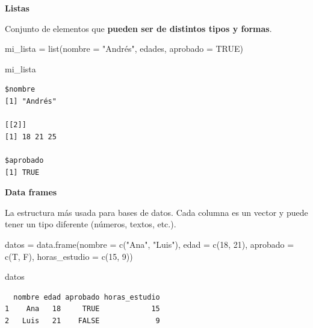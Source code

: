 \documentclass[
  letterpaper,
  DIV=11,
  numbers=noendperiod,
  twoside]{scrreprt}
\newenvironment{Shaded}{\begin{snugshade}}{\end{snugshade}}
\newcommand{\AttributeTok}[1]{\textcolor[rgb]{0.40,0.45,0.13}{#1}}
\newcommand{\ConstantTok}[1]{\textcolor[rgb]{0.56,0.35,0.01}{#1}}
\newcommand{\DecValTok}[1]{\textcolor[rgb]{0.68,0.00,0.00}{#1}}
\newcommand{\FunctionTok}[1]{\textcolor[rgb]{0.28,0.35,0.67}{#1}}
\newcommand{\NormalTok}[1]{\textcolor[rgb]{0.00,0.23,0.31}{#1}}
\newcommand{\OtherTok}[1]{\textcolor[rgb]{0.00,0.23,0.31}{#1}}
\newcommand{\StringTok}[1]{\textcolor[rgb]{0.13,0.47,0.30}{#1}}
\begin{document}
\textbf{Listas}

Conjunto de elementos que \textbf{pueden ser de distintos tipos y
formas}.

\begin{Shaded}
\begin{Highlighting}[]
\NormalTok{mi\_lista }\OtherTok{=} \FunctionTok{list}\NormalTok{(}\AttributeTok{nombre =} \StringTok{"Andrés"}\NormalTok{, edades, }\AttributeTok{aprobado =} \ConstantTok{TRUE}\NormalTok{)}
\end{Highlighting}
\end{Shaded}

\begin{Shaded}
\begin{Highlighting}[]
\NormalTok{mi\_lista}
\end{Highlighting}
\end{Shaded}

\begin{verbatim}
$nombre
[1] "Andrés"

[[2]]
[1] 18 21 25

$aprobado
[1] TRUE
\end{verbatim}

\textbf{Data frames}

La estructura más usada para bases de datos. Cada columna es un vector y
puede tener un tipo diferente (números, textos, etc.).

\begin{Shaded}
\begin{Highlighting}[]
\NormalTok{datos }\OtherTok{=} \FunctionTok{data.frame}\NormalTok{(}\AttributeTok{nombre =} \FunctionTok{c}\NormalTok{(}\StringTok{"Ana"}\NormalTok{, }\StringTok{"Luis"}\NormalTok{), }\AttributeTok{edad =} \FunctionTok{c}\NormalTok{(}\DecValTok{18}\NormalTok{, }\DecValTok{21}\NormalTok{),}
                   \AttributeTok{aprobado =} \FunctionTok{c}\NormalTok{(T, F), }\AttributeTok{horas\_estudio =} \FunctionTok{c}\NormalTok{(}\DecValTok{15}\NormalTok{, }\DecValTok{9}\NormalTok{))}
\end{Highlighting}
\end{Shaded}

\begin{Shaded}
\begin{Highlighting}[]
\NormalTok{datos}
\end{Highlighting}
\end{Shaded}

\begin{verbatim}
  nombre edad aprobado horas_estudio
1    Ana   18     TRUE            15
2   Luis   21    FALSE             9
\end{verbatim}
\end{document}
